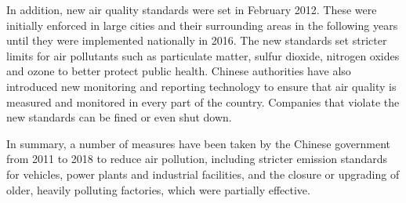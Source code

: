 \documentclass[
]{article}
\begin{document}
	In addition, new air quality standards were set in February 2012. These were initially enforced in large cities and their surrounding areas in the following years until they were implemented nationally in 2016. The new standards set stricter limits for air pollutants such as particulate matter, sulfur dioxide, nitrogen oxides and ozone to better protect public health. Chinese authorities have also introduced new monitoring and reporting technology to ensure that air quality is measured and monitored in every part of the country. Companies that violate the new standards can be fined or even shut down. %
	
	In summary, a number of measures have been taken by the Chinese government from 2011 to 2018 to reduce air pollution, including stricter emission standards for vehicles, power plants and industrial facilities, and the closure or upgrading of older, heavily polluting factories, which were partially effective. %
	
	
\end{document}

